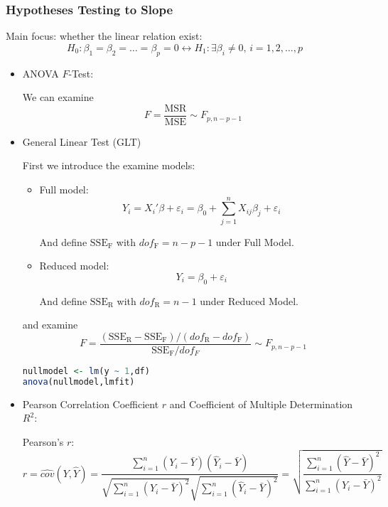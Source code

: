 \subsubsection{Hypotheses Testing to Slope}
    Main focus: whether the linear relation exist:
\begin{equation}
    H_0:\beta _1=\beta _2=\ldots=\beta _p=0\longleftrightarrow H_1:\exists \beta _i\neq 0,\, i=1,2,\ldots,p
\end{equation}
\begin{itemize}[topsep=2pt,itemsep=2pt]
\item ANOVA $ F $-Test:
    
    We can examine  
    \[
        F=\dfrac{\mathrm{MSR}}{\mathrm{MSE}}\sim F_{p,n-p-1} 
    \]
    
\item General Linear Test (GLT)
    
    First we introduce the examine models:
    \begin{itemize}[topsep=2pt,itemsep=2pt]
        \item Full model: 
        \[
            Y_i=X_i'\beta +\varepsilon _i=\beta _0+\sum_{j=1}^nX_{ij}\beta _j+\varepsilon _i
        \]

        And define $ \mathrm{SSE}_\mathrm{F} $ with $ dof_\mathrm{F}=n-p-1 $ under Full Model.
        \item Reduced model: 
        \[
         Y_i=\beta _0+\varepsilon _i 
        \]
        
        And define $ \mathrm{SSE}_\mathrm{R} $ with $ dof_\mathrm{R}=n-1 $ under Reduced Model.
    \end{itemize}

    and examine
    \begin{equation}
        F=\dfrac{(\mathrm{SSE_R-SSE_F})/(dof_\mathrm{R}-dof_\mathrm{F} )}{\mathrm{SSE_F}/dof_F} \sim F_{p,n-p-1}
    \end{equation}
\begin{rcode}
\begin{lstlisting}[language=R]
nullmodel <- lm(y ~ 1,df)
anova(nullmodel,lmfit)
\end{lstlisting}
\end{rcode}

\item Pearson Correlation Coefficient $ r $ and Coefficient of Multiple Determination $ R^2 $:

    Pearson's $ r $:
    \[
        r=\hat{cov}(Y,\hat{Y})=\dfrac{\sum\limits_{i=1}^n(Y_i-\bar{Y})(\hat{Y}_i-\bar{Y})}{\sqrt{\sum\limits_{i=1}^n(Y_i-\bar{Y})^2}\sqrt{\sum\limits_{i=1}^n(\hat{Y}_i-\bar{Y})^2}}=\sqrt{\dfrac{\sum\limits_{i=1}^n(\hat{Y}-\bar{Y})^2}{\sum\limits_{i=1}^n(Y_i-\bar{Y})^2}}
    \]
    

\end{itemize}
